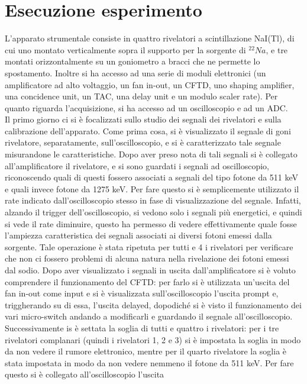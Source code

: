 \section{Esecuzione esperimento}
L'apparato strumentale consiste in quattro rivelatori a scintillazione NaI(Tl), di cui uno montato verticalmente sopra il supporto per la sorgente di $^{22}Na$, e tre
montati orizzontalmente su un goniometro a bracci che ne permette lo spostamento. Inoltre si ha accesso ad una serie di moduli elettronici (un amplificatore ad alto voltaggio,
un fan in-out, un CFTD, uno shaping amplifier, una concidence unit, un TAC, una delay unit e un modulo scaler rate). Per quanto riguarda l'acquisizione, si ha accesso
ad un oscilloscopio e ad un ADC.\\

Il primo giorno ci si è focalizzati sullo studio dei segnali dei rivelatori e sulla calibrazione dell'apparato. Come prima cosa, si è visualizzato il segnale di goni
rivelatore, separatamente, sull'oscilloscopio, e si è caratterizzato tale segnale misurandone le caratteristiche.
Dopo aver preso nota di tali segnali si è collegato all'amplificatore il rivelatore, e si sono guardati i segnali ad oscilloscopio, riconoscendo quali di questi fossero 
associati a segnali del tipo fotone da 511 keV e quali invece
fotone da 1275 keV. Per fare questo si è semplicemente utilizzato il rate indicato dall'oscilloscopio stesso in fase di visualizzazione del segnale. Infatti, alzando il
trigger dell'oscilloscopio, si vedono solo i segnali più energetici, e quindi si vede il rate diminuire, questo ha permesso di vedere effettivamente quale fosse l'ampiezza
caratteristica dei segnali associati ai diversi fotoni emessi dalla sorgente. Tale operazione è stata ripetuta per tutti e 4 i rivelatori per verificare che non ci fossero
problemi di alcuna natura nella rivelazione dei fotoni emessi dal sodio. Dopo aver visualizzato i segnali in uscita dall'amplificatore si è voluto comprendere il funzionamento
del CFTD: per farlo si è utilizzata un'uscita del fan in-out come input e si è visualizzata sull'oscilloscopio l'uscita prompt e, triggherando su di essa, l'uscita delayed,
dopodiché si è visto il funzionamento dei vari micro-switch andando a modificarli e guardando il segnale all'oscilloscopio. Successivamente is è settata la soglia di tutti
e quattro i rivelatori: per i tre rivelatori complanari (quindi i rivelatori 1, 2 e 3) si è impostata la soglia in modo da non vedere il rumore elettronico, mentre per
il quarto rivelatore la soglia è stata impostata in modo da non vedere nemmeno il fotone da 511 keV. Per fare questo si è collegato all'oscilloscopio l'uscita

